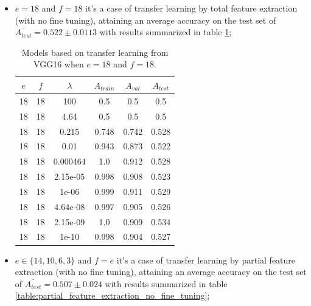 \begin{itemize}
    \item $e = 18$ and $f = 18$ it's a case of transfer learning by total feature extraction (with no fine tuning), attaining an average accuracy on the test set of $\overline{A_{test}} = 0.522 \pm 0.0113$ with results summarized in table \ref{table:total_feature_extraction_no_fine_tuning};

        \begin{table}[ht]
        \centering
        \begin{tabular}{ |c|c|c|c|c|c| }
        \hline
        $e$ & $f$ & $\lambda$ & $A_{train}$ & $A_{val}$ & $A_{test}$ \\
        \hline
        18 & 18 & 100 & 0.5 & 0.5 & 0.5 \\
        18 & 18 & 4.64 & 0.5 & 0.5 & 0.5 \\
        18 & 18 & 0.215 & 0.748 & 0.742 & 0.528 \\
        18 & 18 & 0.01 & 0.943 & 0.873 & 0.522 \\
        18 & 18 & 0.000464 & 1.0 & 0.912 & 0.528 \\
        18 & 18 & 2.15e-05 & 0.998 & 0.908 & 0.523 \\
        18 & 18 & 1e-06 & 0.999 & 0.911 & 0.529 \\
        18 & 18 & 4.64e-08 & 0.997 & 0.905 & 0.526 \\
        18 & 18 & 2.15e-09 & 1.0 & 0.909 & 0.534 \\
        18 & 18 & 1e-10 & 0.998 & 0.904 & 0.527 \\
        \hline
        \end{tabular}
        \caption{Models based on transfer learning from VGG16 when $e = 18$ and $f = 18$.}
        \label{table:total_feature_extraction_no_fine_tuning}
        \end{table}

    \item $e \in \{14,10,6,3\}$ and $f = e$ it's a case of transfer learning by partial feature extraction (with no fine tuning), attaining an average accuracy on the test set of $\overline{A_{test}} = 0.507 \pm 0.024$ with results summarized in table \ref{table:partial_feature_extraction_no_fine_tuning};


\end{itemize}
